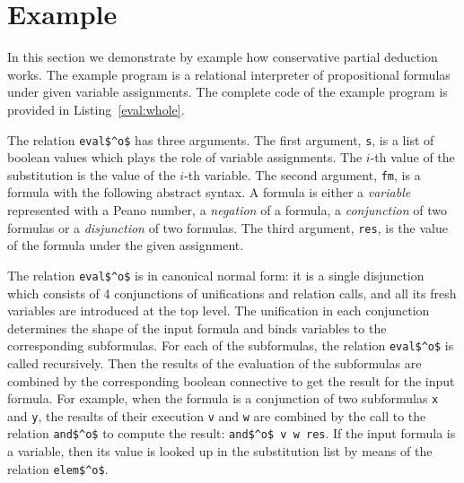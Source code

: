 \section{Example}
\label{example}

In this section we demonstrate by example how conservative partial deduction works.
The example program is a relational interpreter of propositional formulas under given variable assignments.
The complete code of the example program is provided in Listing~\ref{eval:whole}.

The relation \lstinline{eval$^o$} has three arguments.
The first argument, \lstinline{s}, is a list of boolean values which plays the role of variable assignments.
The $i$-th value of the substitution is the value of the $i$-th variable.
The second argument, \lstinline{fm}, is a formula with the following abstract syntax.
A formula is either a \emph{variable} represented with a Peano number, a \emph{negation} of a formula, a \emph{conjunction} of two formulas or a \emph{disjunction} of two formulas.
The third argument, \lstinline{res}, is the value of the formula under the given assignment.

The relation \lstinline{eval$^o$} is in canonical normal form: it is a single disjunction which consists of 4 conjunctions of unifications and relation calls, and all its fresh variables are introduced at the top level.
The unification in each conjunction determines the shape of the input formula and binds variables to the corresponding subformulas.
For each of the subformulas, the relation \lstinline{eval$^o$} is called recursively.
Then the results of the evaluation of the subformulas are combined by the corresponding boolean connective to get the result for the input formula.
For example, when the formula is a conjunction of two subformulas \lstinline{x} and \lstinline{y}, the results of their execution \lstinline{v} and \lstinline{w} are combined by the call to the relation \lstinline{and$^o$} to compute the result: \lstinline{and$^o$ v w res}.
If the input formula is a variable, then its value is looked up in the substitution list by means of the relation \lstinline{elem$^o$}.

